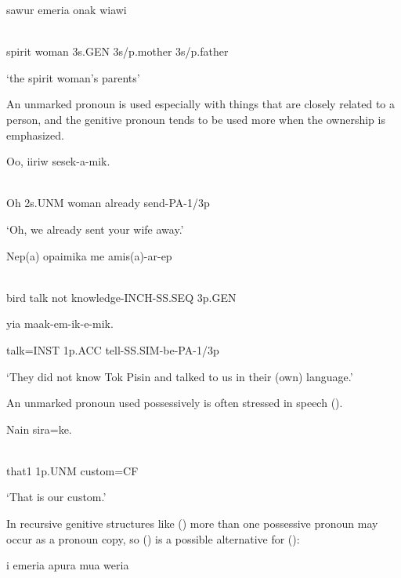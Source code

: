 \ea%
\label{ex:x410}
\gll sawur  emeria    onak  wiawi \\
      \\
\glt
\z

spirit  woman  3s.GEN  3s/p.mother  3s/p.father

`the spirit woman's parents'

An unmarked pronoun is used especially with things that are closely related to a person, and the genitive pronoun tends to be used more when the ownership is emphasized. 

\ea%
\label{ex:x1315}
\gll Oo,    iiriw  sesek-a-mik. \\
      \\
\glt
\z

Oh  2s.UNM  woman  already  send-PA-1/3p

`Oh, we already sent your wife away.'

\ea%
\label{ex:x1314}
\gll Nep(a)  opaimika  me  amis(a)-ar-ep   \\
      \\
\glt
\z

bird  talk  not  knowledge-INCH-SS.SEQ  3p.GEN

  yia  maak-em-ik-e-mik.

talk=INST  1p.ACC  tell-SS.SIM-be-PA-1/3p

`They did not know Tok Pisin and talked to us in their (own) language.'

An unmarked pronoun used possessively is often stressed in speech ().

\ea%
\label{ex:x408}
\gll Nain   sira=ke. \\
      \\
\glt
\z

that1  1p.UNM  custom=CF

`That is our custom.'

In recursive genitive structures like () more than one possessive pronoun may occur as a pronoun copy, so () is a possible alternative for ():

\ea%
\label{ex:x411}
\gll i  emeria  apura    mua  weria   \\
      \\
\glt
\z

